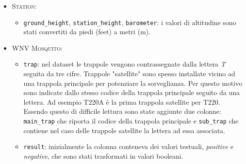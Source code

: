 \begin{itemize}
	\item \textsc{Station}:
	\begin{itemize}
    	\item \texttt{ground\_height}, \texttt{station\_height}, 
    	\texttt{barometer}: i valori di altitudine sono stati convertiti da
    	piedi (feet) a metri (m).
	\end{itemize}
		
	\item \textsc{WNV Mosquito}:
	
	\begin{itemize}
		
		\item \texttt{trap}: nel dataset le trappole vengono contrassegnate 
		dalla lettera \textit{T} seguita da tre cifre. Trappole "satellite" 
		sono spesso installate vicino ad una trappola principale per potenziare 
		la sorveglianza. Per questo motivo sono indicate dallo stesso codice 
		della trappola principale seguito da una lettera. Ad esempio T220A è la 
		prima trappola satellite per T220. Essendo questo di difficile lettura 
		sono state aggiunte due colonne: \texttt{main\_trap} che riporta il 
		codice della trappola principale e \texttt{sub\_trap} che contiene nel 
		caso delle trappole satellite la lettera ad essa associata.
		
		\item \texttt{result}: inizialmente la colonna conteneva dei valori  
		testuali, \textit{positive} e \textit{negative}, che sono stati 
		trasformati in valori booleani.			
	\end{itemize}
\end{itemize}
